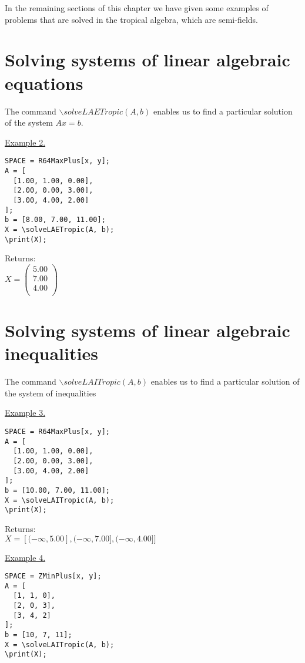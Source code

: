 In the remaining sections of this chapter we have given some examples of problems that are solved in the tropical algebra, which are semi-fields.
\section{Solving systems of linear algebraic equations}
The command $\backslash solveLAETropic(A, b)$ enables us to find a particular solution of the system 
$Ax = b$.
\smallskip

\underline{Example 2. }

\begin{verbatim}
SPACE = R64MaxPlus[x, y];
A = [
  [1.00, 1.00, 0.00],
  [2.00, 0.00, 3.00],
  [3.00, 4.00, 2.00]
];
b = [8.00, 7.00, 11.00];
X = \solveLAETropic(A, b); 
\print(X);
\end{verbatim}

Returns:\\
$X = \left(\begin{array}{c}
5.00\\
7.00\\
4.00\\
\end{array}\right)
$ 
 
\section{Solving systems of linear algebraic inequalities}
The command $\backslash solveLAITropic(A,b)$ enables us to find a particular solution of the system of inequalities 
\smallskip

\underline{Example 3. }

\vspace*{-3mm}
\begin{verbatim}
SPACE = R64MaxPlus[x, y];
A = [
  [1.00, 1.00, 0.00],
  [2.00, 0.00, 3.00],
  [3.00, 4.00, 2.00]
];
b = [10.00, 7.00, 11.00]; 
X = \solveLAITropic(A, b); 
\print(X);
\end{verbatim}

Returns:\\
$X=[(-\infty,5.00],(-\infty,7.00],(-\infty,4.00]]$ 

\smallskip

\underline{Example 4. }

\vspace*{-3mm}
\begin{verbatim}
SPACE = ZMinPlus[x, y];
A = [
  [1, 1, 0],
  [2, 0, 3],
  [3, 4, 2]
];
b = [10, 7, 11];
X = \solveLAITropic(A, b); 
\print(X);
\end{verbatim}

